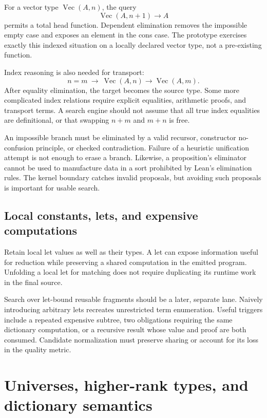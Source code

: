 \documentclass[11pt,letterpaper]{article}
\newcommand{\code}[1]{\texttt{\detokenize{#1}}}
\theoremstyle{definition}\newtheorem{definition}[theorem]{Definition}
\theoremstyle{remark}\newtheorem{remark}[theorem]{Remark}
\begin{document}
For a vector type $\operatorname{Vec}(A,n)$, the query
\[
 \operatorname{Vec}(A,n+1)\to A
\]
permits a total head function. Dependent elimination removes the impossible empty
case and exposes an element in the cons case. The prototype exercises exactly
this indexed situation on a locally declared vector type, not a pre-existing
\code{head} function.

Index reasoning is also needed for transport:
\[
 n=m\ \to\ \operatorname{Vec}(A,n)\to\operatorname{Vec}(A,m).
\]
After equality elimination, the target becomes the source type. Some more
complicated index relations require explicit equalities, arithmetic proofs, and
transport terms. A search engine should not assume that all true index equalities
are definitional, or that swapping $n+m$ and $m+n$ is free.

An impossible branch must be eliminated by a valid recursor, constructor
no-confusion principle, or checked contradiction. Failure of a heuristic
unification attempt is not enough to erase a branch. Likewise, a proposition's
eliminator cannot be used to manufacture data in a sort prohibited by Lean's
elimination rules. The kernel boundary catches invalid proposals, but avoiding
such proposals is important for usable search.

\subsection{Local constants, lets, and expensive computations}

Retain local let values as well as their types. A let can expose information
useful for reduction while preserving a shared computation in the emitted
program. Unfolding a local let for matching does not require duplicating its
runtime work in the final source.

Search over let-bound reusable fragments should be a later, separate lane.
Naively introducing arbitrary lets recreates unrestricted term enumeration.
Useful triggers include a repeated expensive subtree, two obligations requiring
the same dictionary computation, or a recursive result whose value and proof are
both consumed. Candidate normalization must preserve sharing or account for its
loss in the quality metric.

\section{Universes, higher-rank types, and dictionary semantics}
\label{sec:universes}
\end{document}
